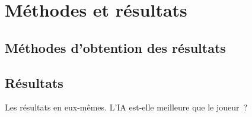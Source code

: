 \chapter{Méthodes et résultats} \label{chapter:methodes-resultats}

\section{Méthodes d'obtention des résultats}

\section{Résultats}

Les résultats en eux-mêmes. L'IA est-elle meilleure que le joueur ?

